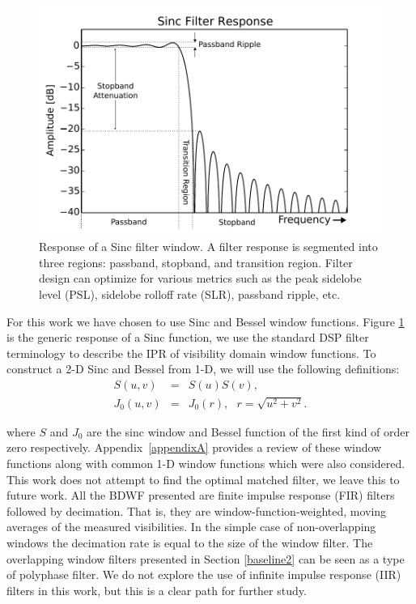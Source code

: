 \documentclass[useAMS,usenatbib]{mn2e}
\begin{document}
\begin{figure} 
\includegraphics[width=\columnwidth]{./Figures/sinc_response_labelled.pdf}
\caption{Response of a Sinc filter window. A filter response is segmented into
three regions: passband, stopband, and transition region. Filter design can
optimize for various metrics such as the peak sidelobe level (PSL), sidelobe
rolloff rate (SLR), passband ripple, etc.}
\label{fig:sinc_response}
\end{figure}

For this work we have chosen to use Sinc and Bessel window functions.
Figure \ref{fig:sinc_response} is the generic response of a Sinc function, we
use the standard DSP filter terminology to describe the IPR of visibility domain
window functions.
To construct a 2-D  Sinc and Bessel from 1-D, we will use the following definitions:
\begin{eqnarray}
S(u,v) &=& S(u)S(v), \nonumber\\
J_0(u,v) &=& J_0(r), ~~~r=\sqrt{u^2+v^2}.\nonumber
\end{eqnarray}

where $S$ and $J_0$ are the sinc window and Bessel function of the
first kind of order zero \citep{watson1995treatise} respectively.
Appendix~\ref{appendixA} provides a review of these window functions along with
common 1-D window functions which were also considered. This work does not 
attempt to find the optimal matched filter, we leave this to future work.
All the BDWF presented are finite impulse response (FIR) filters followed by
decimation. That is, they are window-function-weighted, moving averages of the
measured visibilities. In the simple case of non-overlapping windows the
decimation rate is equal to the size of the window filter. The overlapping
window filters presented in Section \ref{baseline2} can be seen as a type of
polyphase filter.
We do not explore the use of infinite impulse response (IIR) filters in this
work, but this is a clear path for further study.
\end{document}
